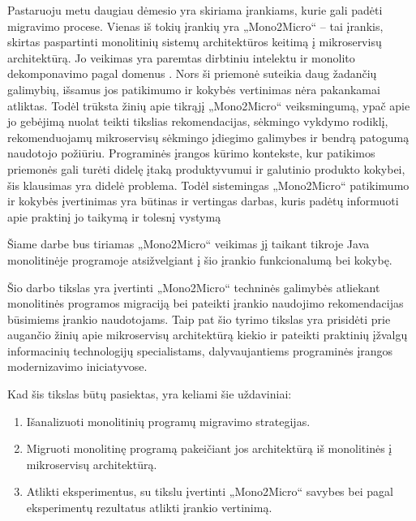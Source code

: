 \documentclass{VUMIFPSbakalaurinis}
\begin{document}
Pastaruoju metu daugiau dėmesio yra skiriama įrankiams, kurie gali padėti migravimo procese. Vienas iš tokių įrankių yra „Mono2Micro“ -- tai įrankis, skirtas paspartinti monolitinių sistemų architektūros keitimą į mikroservisų architektūrą. Jo veikimas yra paremtas dirbtiniu intelektu ir monolito dekomponavimo pagal domenus \cite{KXK+21}. %
Nors ši priemonė suteikia daug žadančių galimybių, išsamus jos patikimumo ir kokybės vertinimas nėra pakankamai atliktas. Todėl trūksta žinių apie tikrąjį „Mono2Micro“ veiksmingumą, ypač apie jo gebėjimą nuolat teikti tikslias rekomendacijas, sėkmingo vykdymo rodiklį, rekomenduojamų mikroservisų sėkmingo įdiegimo galimybes ir bendrą patogumą naudotojo požiūriu. Programinės įrangos kūrimo kontekste, kur patikimos priemonės gali turėti didelę įtaką produktyvumui ir galutinio produkto kokybei, šis klausimas yra didelė problema. Todėl sistemingas „Mono2Micro“ patikimumo ir kokybės įvertinimas yra būtinas ir vertingas darbas, kuris padėtų informuoti apie praktinį jo taikymą ir tolesnį vystymą

Šiame darbe bus tiriamas „Mono2Micro“ veikimas jį taikant tikroje Java monolitinėje programoje atsižvelgiant į šio įrankio funkcionalumą bei kokybę.

Šio darbo tikslas yra įvertinti „Mono2Micro“ techninės galimybės atliekant monolitinės programos migraciją bei pateikti įrankio naudojimo rekomendacijas būsimiems įrankio naudotojams. Taip pat šio tyrimo tikslas yra prisidėti prie augančio žinių apie mikroservisų architektūrą kiekio ir pateikti praktinių įžvalgų informacinių technologijų specialistams, dalyvaujantiems programinės įrangos modernizavimo iniciatyvose.

Kad šis tikslas būtų pasiektas, yra keliami šie uždaviniai:
\begin{enumerate}

    \item Išanalizuoti monolitinių programų migravimo strategijas.

    \item Migruoti monolitinę programą pakeičiant jos architektūrą iš monolitinės į mikroservisų architektūrą.

    \item Atlikti eksperimentus, su tikslu įvertinti „Mono2Micro“ savybes bei pagal eksperimentų rezultatus atlikti įrankio vertinimą.
    
\end{enumerate}
\end{document}
